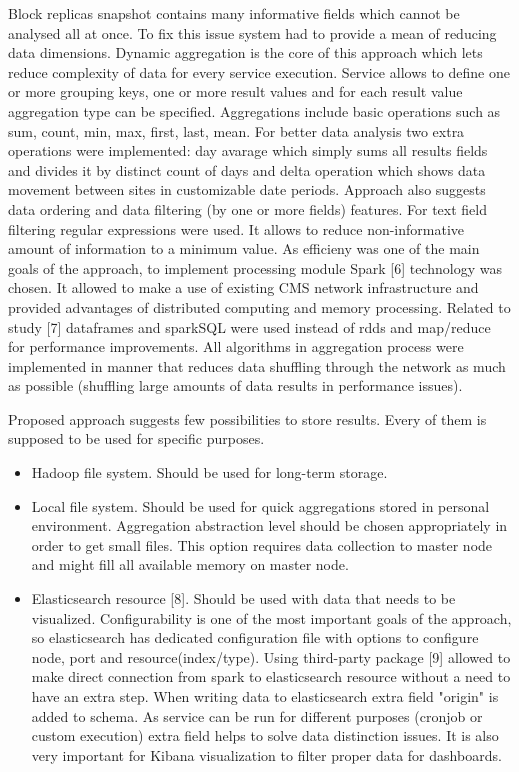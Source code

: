 \documentclass[a4paper]{jpconf}
\begin{document}
Block replicas snapshot contains many informative fields which cannot be analysed all at once. To fix this issue system had to provide a mean of reducing data dimensions. Dynamic aggregation 
is the core of this approach which lets reduce complexity of data for every service execution. Service allows to define one or more grouping keys, one or more result values and for each 
result value aggregation type can be specified. Aggregations include basic operations such as sum, count, min, max, first, last, mean. For better data analysis two extra operations were implemented: 
day avarage which simply sums all results fields and divides it by distinct count of days and delta operation which shows data movement between sites in customizable date periods. Approach 
also suggests data ordering and data filtering (by one or more fields) features. For text field filtering regular expressions were used. It allows to reduce non-informative amount of information to 
a minimum value. As efficieny was one of the main goals of the approach, to implement processing module Spark [6]  technology was chosen. It allowed to make a use of existing CMS network 
infrastructure and provided advantages of distributed computing and memory processing. Related to study [7]  dataframes and sparkSQL were used instead of rdds and map/reduce for performance 
improvements. All algorithms in aggregation process were implemented in manner that reduces data shuffling through the network as much as possible (shuffling large amounts of data results in performance 
issues). 

Proposed approach suggests few possibilities to store results. Every of them is supposed to be used for specific purposes.
\begin{itemize}
\item Hadoop file system. Should be used for long-term storage. 
\item Local file system. Should be used for quick aggregations stored in personal environment. Aggregation abstraction level should be chosen appropriately in order to get small files. 
This option requires data collection to master node and might fill all available memory on master node.
\item Elasticsearch resource [8]. Should be used with data that needs to be visualized. Configurability is one of the most important goals of the approach, so elasticsearch has dedicated 
configuration file with options to configure node, port and resource(index/type). Using third-party package [9] allowed to make direct connection from spark to elasticsearch resource 
without a need to have an extra step. When writing data to elasticsearch extra field "origin" is added to schema. As service can be run for different purposes (cronjob or custom execution) 
extra field helps to solve data distinction issues. It is also very important for Kibana visualization to filter proper data for dashboards.
\end{itemize}
\end{document}
